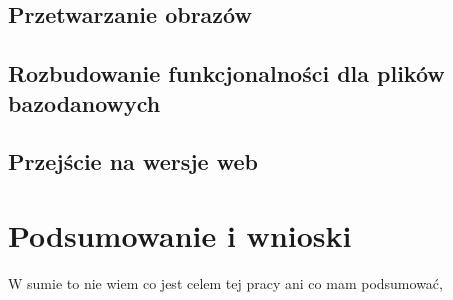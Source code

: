 \documentclass[12pt,a4paper,twoside]{article}
\begin{document}
\subsection{Przetwarzanie obrazów}
\subsection{Rozbudowanie funkcjonalności dla plików bazodanowych}
\subsection{Przejście na wersje web}
\section*{Podsumowanie i wnioski}
W sumie to nie wiem co jest celem tej pracy ani co mam podsumować, 
\listoffigures
{}
\end{document}
